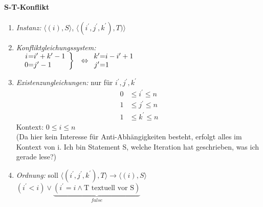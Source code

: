 \paragraph{S-T-Konflikt}
\begin{enumerate}
    \item \textit{Instanz:} $\langle (i), S \rangle$, $\langle (i^\prime, j^\prime, k^\prime), T) \rangle$

    \item \textit{Konfliktgleichungssystem:} \\
        $\begin{array}{cc}
        \left.
        \begin{array}{c@= l}
            i & i^\prime + k^\prime-1\\
            0 & j^\prime -1
        \end{array} \right\} & \Leftrightarrow
        \begin{array}{c@= l}
            k^\prime & i-i^\prime +1 \\
            j^\prime & 1
        \end{array}
        \end{array}$


    \item \textit{Existenzungleichungen:} nur für $i^\prime, j^\prime, k^\prime$\\
        \begin{align*}
        0 &\leq i^\prime \leq n \\
        1 &\leq j^\prime \leq n \\
        1 &\leq k^\prime \leq n
        \end{align*}
        Kontext: $0 \leq i \leq n$\\
        (Da hier kein Interesse für Anti-Abhängigkeiten besteht, erfolgt alles im Kontext von i. \glqq Ich bin Statement S, welche Iteration hat geschrieben, was ich gerade lese?\grqq)
    \item \textit{Ordnung:} soll $\langle ( i^\prime, j^\prime, k^\prime), T \rangle \rightarrow \langle (i), S \rangle$\\

    $(i^\prime < i) \lor \underbrace{(i^\prime = i \land \text{T textuell vor S})}_{false}$



\end{enumerate}

